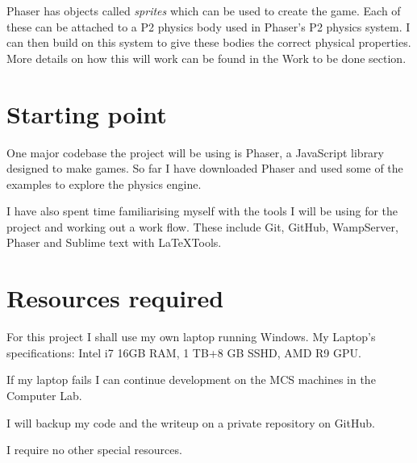 \documentclass[12pt,a4paper,twoside]{article}
\begin{document}
Phaser has objects called \emph{sprites} which can be used to create the game. Each of these can be attached to a P2 physics body used in Phaser's P2 physics system. I can then build on this system to give these bodies the correct physical properties.
More details on how this will work can be found in the Work to be done section.


 

\section*{Starting point}


One major codebase the project will be using is Phaser, a JavaScript library designed to make games.
So far I have downloaded Phaser and used some of the examples to explore the physics engine.

I have also spent time familiarising myself with the tools I will be using for the project and working out a work flow. These include Git, GitHub, WampServer, Phaser and Sublime text with LaTeXTools.

\section*{Resources required}


For this project I shall use my own laptop running Windows.
My Laptop's specifications:
Intel i7 16GB RAM, 1 TB+8 GB SSHD, AMD R9 GPU.

If my laptop fails I can continue development on the MCS machines in the Computer Lab.

I will backup my code and the writeup on a private repository on GitHub.

I require no other special resources.
\end{document}
